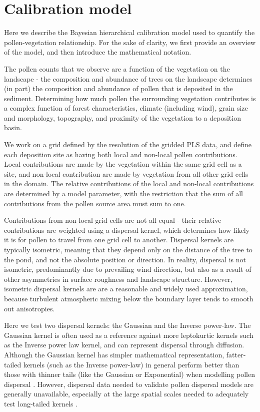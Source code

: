 \documentclass[12pt]{article}
\begin{document}
\section{Calibration model}

Here we describe the Bayesian hierarchical calibration model used to
quantify the pollen-vegetation relationship. For the sake of clarity,
we first provide an overview of the model, and then introduce the
mathematical notation.

The pollen counts that we observe are a function of the vegetation on
the landscape - the composition and abundance of trees on the
landscape determines (in part) the composition and abundance of pollen
that is deposited in the sediment. Determining how much pollen the
surrounding vegetation contributes is a complex function of forest
characteristics, climate (including wind), grain size and morphology,
topography, and proximity of the vegetation to a deposition basin.

We work on a grid defined by the resolution of the gridded PLS data,
and define each deposition site as having both local and non-local
pollen contributions. Local contributions are made by the vegetation
within the same grid cell as a site, and non-local contribution are
made by vegetation from all other grid cells in the domain. The
relative contributions of the local and non-local contributions are
determined by a model parameter, with the restriction that the sum of
all contributions from the pollen source area must sum to one.

Contributions from non-local grid cells are not all equal - their
relative contributions are weighted using a dispersal kernel, which
determines how likely it is for pollen to travel from one grid cell to
another. Dispersal kernels are typically isometric, meaning that they
depend only on the distance of the tree to the pond, and not the
absolute position or direction. In reality, dispersal is not
isometric, predominantly due to prevailing wind direction, but also as
a result of other asymmetries in surface roughness and landscape
structure. However, isometric dispersal kernels are are a reasonable
and widely used approximation, because turbulent atmospheric mixing
below the boundary layer tends to smooth out anisotropies.

Here we test two dispersal kernels: the Gaussian and the Inverse
power-law. The Gaussian kernel is often used as a reference against
more leptokurtic kernels such as the Inverse power law kernel, and can
represent dispersal through diffusion. Although the Gaussian kernel
has simpler mathematical representation, fatter-tailed kernels (such
as the Inverse power-law) in general perform better than those with
thinner tails (like the Gaussian or Exponential) when modelling pollen
dispersal \citep{devaux2007modelling, austerlitz2004using}. However,
dispersal data needed to validate pollen dispersal models are
generally unavailable, especially at the large spatial scales needed
to adequately test long-tailed kernels \citep{clobert2012dispersal}.
\end{document}
